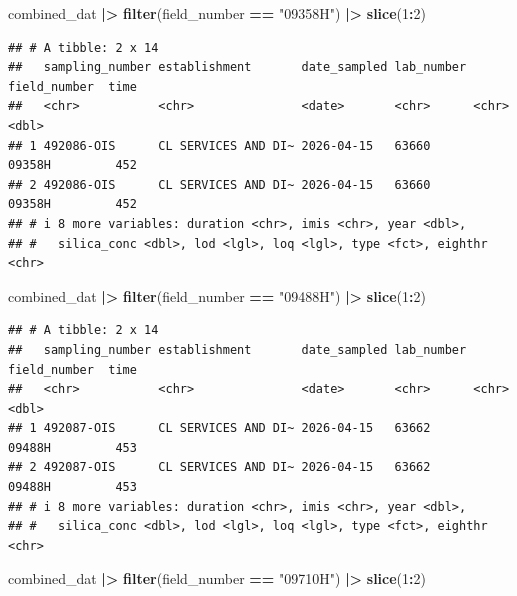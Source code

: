\documentclass[
]{article}
\newenvironment{Shaded}{\begin{snugshade}}{\end{snugshade}}
\newcommand{\DecValTok}[1]{\textcolor[rgb]{0.00,0.00,0.81}{#1}}
\newcommand{\FunctionTok}[1]{\textcolor[rgb]{0.13,0.29,0.53}{\textbf{#1}}}
\newcommand{\NormalTok}[1]{#1}
\newcommand{\SpecialCharTok}[1]{\textcolor[rgb]{0.81,0.36,0.00}{\textbf{#1}}}
\newcommand{\StringTok}[1]{\textcolor[rgb]{0.31,0.60,0.02}{#1}}
\begin{document}
\begin{Shaded}
\begin{Highlighting}[]
\NormalTok{combined\_dat }\SpecialCharTok{|\textgreater{}} 
  \FunctionTok{filter}\NormalTok{(field\_number }\SpecialCharTok{==} \StringTok{"09358H"}\NormalTok{) }\SpecialCharTok{|\textgreater{}} 
  \FunctionTok{slice}\NormalTok{(}\DecValTok{1}\SpecialCharTok{:}\DecValTok{2}\NormalTok{)}
\end{Highlighting}
\end{Shaded}

\begin{verbatim}
## # A tibble: 2 x 14
##   sampling_number establishment       date_sampled lab_number field_number  time
##   <chr>           <chr>               <date>       <chr>      <chr>        <dbl>
## 1 492086-OIS      CL SERVICES AND DI~ 2026-04-15   63660      09358H         452
## 2 492086-OIS      CL SERVICES AND DI~ 2026-04-15   63660      09358H         452
## # i 8 more variables: duration <chr>, imis <chr>, year <dbl>,
## #   silica_conc <dbl>, lod <lgl>, loq <lgl>, type <fct>, eighthr <chr>
\end{verbatim}

\begin{Shaded}
\begin{Highlighting}[]
\NormalTok{combined\_dat }\SpecialCharTok{|\textgreater{}} 
  \FunctionTok{filter}\NormalTok{(field\_number }\SpecialCharTok{==} \StringTok{"09488H"}\NormalTok{) }\SpecialCharTok{|\textgreater{}} 
  \FunctionTok{slice}\NormalTok{(}\DecValTok{1}\SpecialCharTok{:}\DecValTok{2}\NormalTok{)}
\end{Highlighting}
\end{Shaded}

\begin{verbatim}
## # A tibble: 2 x 14
##   sampling_number establishment       date_sampled lab_number field_number  time
##   <chr>           <chr>               <date>       <chr>      <chr>        <dbl>
## 1 492087-OIS      CL SERVICES AND DI~ 2026-04-15   63662      09488H         453
## 2 492087-OIS      CL SERVICES AND DI~ 2026-04-15   63662      09488H         453
## # i 8 more variables: duration <chr>, imis <chr>, year <dbl>,
## #   silica_conc <dbl>, lod <lgl>, loq <lgl>, type <fct>, eighthr <chr>
\end{verbatim}

\begin{Shaded}
\begin{Highlighting}[]
\NormalTok{combined\_dat }\SpecialCharTok{|\textgreater{}} 
  \FunctionTok{filter}\NormalTok{(field\_number }\SpecialCharTok{==} \StringTok{"09710H"}\NormalTok{) }\SpecialCharTok{|\textgreater{}} 
  \FunctionTok{slice}\NormalTok{(}\DecValTok{1}\SpecialCharTok{:}\DecValTok{2}\NormalTok{)}
\end{Highlighting}
\end{Shaded}
\end{document}

